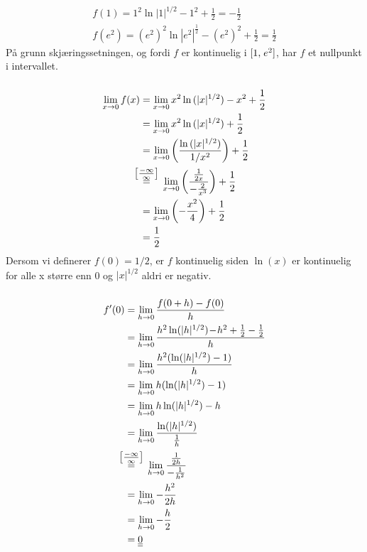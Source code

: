 \documentclass[defaultpackages]{cheatsheet}
\newcommand\neginfinf{\stackrel{\mathclap{\normalfont\mbox{$\left[\frac{-\infty}{\infty}\right]$}}}{=}}
\def\doubleunderline#1{\underline{\underline{#1}}}
\begin{document}
\subsubsection{}
\begin{align*}
	f(1) = 1^2\ln{|1|^{1/2}} - 1^2 + \frac{1}{2} = -\frac{1}{2}\\
	f(e^2) = (e^2)^2 \ln{|e^2|^{\frac{1}{2}}} - (e^2)^2 + \frac{1}{2} = \frac{1}{2}
\end{align*}
På grunn skjæringssetningen, og fordi $f$ er kontinuelig i $\interval[{1,\;e^2}]$, har $f$ et nullpunkt i intervallet.
\subsubsection{}
\begin{align*}
	\lim_{x\to 0} f(x) &= \lim_{x\to 0} x^2\ln{(|x|^{1/2})} - x^2 + \frac{1}{2}\\
	&= \lim_{x\to 0} x^2\ln{(|x|^{1/2})} + \frac{1}{2}\\
	&= \lim_{x\to 0} \left(\frac{\ln{(|x|^{1/2})}}{1/x^2}\right) + \frac{1}{2}\\
&\neginfinf \quad \lim_{x\to 0} \left( \frac{\frac{1}{2x}}{-\frac{2}{x^3}} \right)+\frac{1}{2}\\
	&=\lim_{x\to 0} \left(-\frac{x^2}{4}\right) +\frac{1}{2}\\
	&= \frac{1}{2}
\end{align*}
Dersom vi definerer $f(0)=1/2$, er $f$ kontinuelig siden $\ln(x)$ er kontinuelig for alle x større enn 0 og $|x|^{1/2}$  aldri er negativ.

\subsubsection{}
\begin{align*}
f'(0) &= \lim_{h\to 0}\frac{f(0 + h) - f(0)}{h}\\
&= \lim_{h\to 0} \frac{h^2\ln (|h|^{1/2})\!-\!h^2+\frac{1}{2} - \frac{1}{2}}{h}\\
&=\lim_{h\to 0} \frac{h^2(\ln(|h|^{1/2}) - 1)}{h}\\
&=\lim_{h\to 0} h(\ln(|h|^{1/2})-1)\\
&=\lim_{h\to 0} h\ln(|h|^{1/2}) - h\\
&=\lim_{h\to 0} \frac{\ln (|h|^{1/2})}{\frac{1}{h}}\\
&\neginfinf \quad \lim_{h\to 0} \frac{\frac{1}{2h}}{-\frac{1}{h^2}}\\
&=\lim_{h\to 0} -\frac{h^2}{2h}\\
&=\lim_{h\to 0} -\frac{h}{2}\\
&=\doubleunderline{0}
\end{align*}
\end{document}
